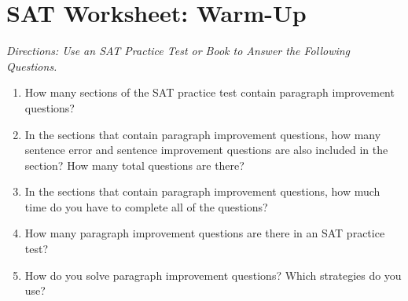 \section{SAT Worksheet: Warm-Up}

\textit{Directions: Use an SAT Practice Test or Book to Answer the Following Questions.}

\begin{enumerate}
\item How many sections of the SAT practice test contain paragraph improvement questions? \shortline
\item In the sections that contain paragraph improvement questions, how many sentence error and sentence improvement questions are also included in the section? How many total questions are there? \shortline
\item In the sections that contain paragraph improvement questions, how much time do you have to complete all of the questions? \shortline
\item\sloppy How many paragraph improvement questions are there in an SAT practice test? \shortline
\item\sloppy How do you solve paragraph improvement questions? Which strategies do you use? \shortline
\end{enumerate}
